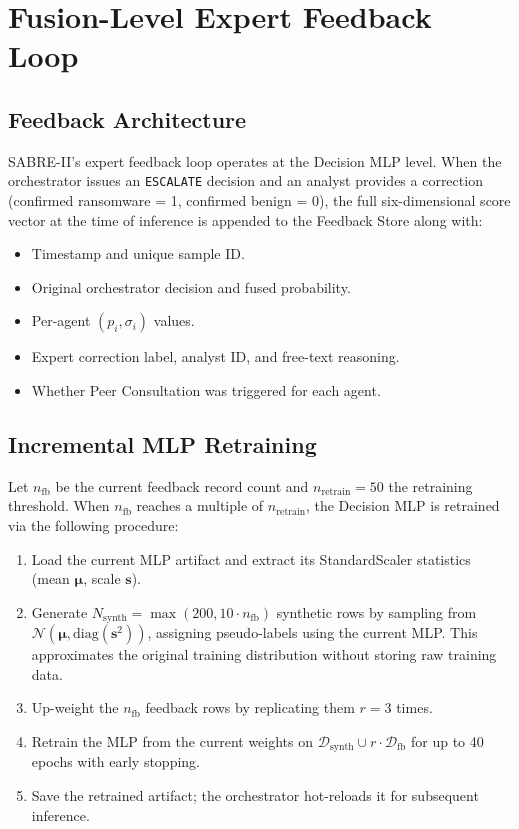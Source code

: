 \documentclass[journal]{IEEEtran}
\begin{document}
\section{Fusion-Level Expert Feedback Loop}
\label{sec:feedback}

\subsection{Feedback Architecture}

SABRE-II's expert feedback loop operates at the Decision MLP level.
When the orchestrator issues an \texttt{ESCALATE} decision and an analyst
provides a correction (confirmed ransomware = 1, confirmed benign = 0),
the full six-dimensional score vector at the time of inference is
appended to the Feedback Store along with:
\begin{itemize}
  \item Timestamp and unique sample ID.
  \item Original orchestrator decision and fused probability.
  \item Per-agent $(p_i, \sigma_i)$ values.
  \item Expert correction label, analyst ID, and free-text reasoning.
  \item Whether Peer Consultation was triggered for each agent.
\end{itemize}

\subsection{Incremental MLP Retraining}

Let $n_{\mathrm{fb}}$ be the current feedback record count and
$n_{\mathrm{retrain}} = 50$ the retraining threshold.
When $n_{\mathrm{fb}}$ reaches a multiple of $n_{\mathrm{retrain}}$,
the Decision MLP is retrained via the following procedure:

\begin{enumerate}
  \item Load the current MLP artifact and extract its StandardScaler
        statistics (mean $\boldsymbol{\mu}$, scale $\boldsymbol{s}$).
  \item Generate $N_{\mathrm{synth}} = \max(200, 10 \cdot n_{\mathrm{fb}})$
        synthetic rows by sampling from
        $\mathcal{N}(\boldsymbol{\mu}, \mathrm{diag}(\boldsymbol{s}^2))$,
        assigning pseudo-labels using the current MLP.
        This approximates the original training distribution without storing
        raw training data.
  \item Up-weight the $n_{\mathrm{fb}}$ feedback rows by replicating them
        $r = 3$ times.
  \item Retrain the MLP from the current weights on
        $\mathcal{D}_{\mathrm{synth}} \cup r \cdot \mathcal{D}_{\mathrm{fb}}$
        for up to 40 epochs with early stopping.
  \item Save the retrained artifact; the orchestrator hot-reloads it
        for subsequent inference.
\end{enumerate}
\end{document}

